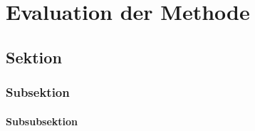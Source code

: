 \chapter{Evaluation der Methode}
\label{ch:EvaluationDerMethode}





\section{Sektion}
\lipsum[1]




\subsection{Subsektion}
\lipsum[1]



\subsubsection{Subsubsektion}
\lipsum[1-5]